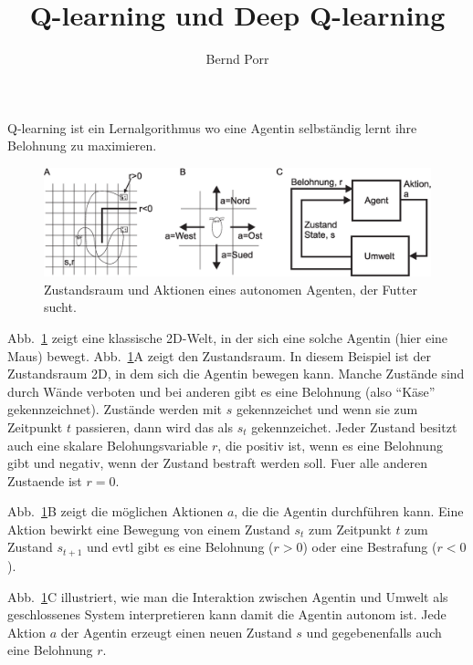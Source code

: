 \documentclass[12pt]{report}
\author{Bernd Porr}
\title{Q-learning und Deep Q-learning}
\begin{document}
\maketitle

Q-learning ist ein Lernalgorithmus wo eine Agentin selbständig
lernt ihre Belohnung zu maximieren.

\begin{figure}[!hbt]
\begin{center}
\mbox{\includegraphics[width=\textwidth]{state_action}}
\end{center}
\caption{Zustandsraum und Aktionen eines autonomen Agenten,
  der Futter sucht.
\label{state_action}}
\end{figure}

Abb.~\ref{state_action} zeigt eine klassische 2D-Welt, in der sich
eine solche Agentin (hier eine Maus) bewegt. Abb.~\ref{state_action}A
zeigt den Zustandsraum. In diesem Beispiel ist der Zustandsraum 2D, in
dem sich die Agentin bewegen kann. Manche Zustände sind durch Wände
verboten und bei anderen gibt es eine Belohnung (also ``Käse''
gekennzeichnet).  Zustände werden mit $s$ gekennzeichet und wenn sie
zum Zeitpunkt $t$ passieren, dann wird das als $s_t$
gekennzeichet. Jeder Zustand besitzt auch eine skalare
Belohungsvariable $r$, die positiv ist, wenn es eine Belohnung gibt
und negativ, wenn der Zustand bestraft werden soll. Fuer alle anderen
Zustaende ist $r=0$.

Abb.~\ref{state_action}B zeigt die möglichen Aktionen $a$, die die
Agentin durchführen kann. Eine Aktion bewirkt eine Bewegung von einem
Zustand $s_t$ zum Zeitpunkt $t$ zum Zustand $s_{t+1}$ und evtl gibt
es eine Belohnung ($r>0$) oder eine Bestrafung ($r<0$).

Abb.~\ref{state_action}C illustriert, wie man die Interaktion
zwischen Agentin und Umwelt als geschlossenes System interpretieren
kann damit die Agentin autonom ist. Jede Aktion $a$ der Agentin
erzeugt einen neuen Zustand $s$ und gegebenenfalls auch eine
Belohnung $r$.
\end{document}
